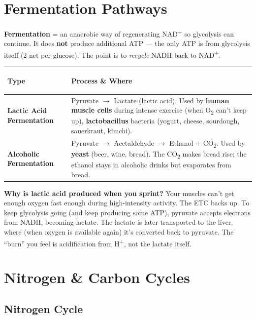 \documentclass[11pt, letterpaper]{article}
\begin{document}
\section*{Fermentation Pathways}

\textbf{Fermentation} = an anaerobic way of regenerating NAD\textsuperscript{+} so glycolysis
can continue. It does \textbf{not} produce additional ATP --- the only ATP is from glycolysis
itself (2 net per glucose). The point is to \emph{recycle} NADH back to NAD\textsuperscript{+}.

\noindent
{\renewcommand{\arraystretch}{1.6}
\begin{tabularx}{\textwidth}{>{\bfseries\raggedright\arraybackslash}p{3cm}
                              >{\raggedright\arraybackslash}X}
\toprule
\rowcolor{tableheaderteal}
\textbf{Type} & \textbf{Process \& Where} \\
\midrule
\rowcolor{rowTe} \textbf{Lactic Acid Fermentation} & Pyruvate $\to$ Lactate (lactic acid). Used by \textbf{human muscle cells} during intense exercise (when O\textsubscript{2} can't keep up), \textbf{lactobacillus} bacteria (yogurt, cheese, sourdough, sauerkraut, kimchi). \\
\rowcolor{rowA}  \textbf{Alcoholic Fermentation} & Pyruvate $\to$ Acetaldehyde $\to$ Ethanol + CO\textsubscript{2}. Used by \textbf{yeast} (beer, wine, bread). The CO\textsubscript{2} makes bread rise; the ethanol stays in alcoholic drinks but evaporates from bread. \\
\bottomrule
\end{tabularx}}

\textbf{Why is lactic acid produced when you sprint?} Your muscles can't get enough oxygen
fast enough during high-intensity activity. The ETC backs up. To keep glycolysis going (and
keep producing some ATP), pyruvate accepts electrons from NADH, becoming lactate. The lactate
is later transported to the liver, where (when oxygen is available again) it's converted
back to pyruvate. The ``burn'' you feel is acidification from H\textsuperscript{+}, not the
lactate itself.

\section*{Nitrogen \& Carbon Cycles}

\subsection*{Nitrogen Cycle}
\end{document}
